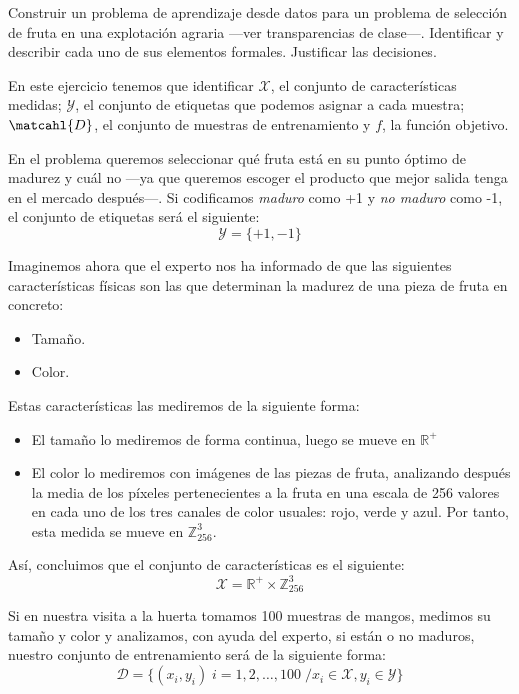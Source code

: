 \documentclass[a4paper, 11pt]{article}
\begin{document}
    \begin{ejercicio}
        Construir un problema de aprendizaje desde datos para un problema de selección de fruta en una explotación agraria ---ver transparencias de clase---. Identificar y describir cada uno de sus elementos formales. Justificar las decisiones.
    \end{ejercicio}

    \begin{solucion}
        En este ejercicio tenemos que identificar $\mathcal{X}$, el conjunto de características medidas; $\mathcal{Y}$, el conjunto de etiquetas que podemos asignar a cada muestra; $\matcahl{D}$, el conjunto de muestras de entrenamiento y $f$, la función objetivo.

        En el problema queremos seleccionar qué fruta está en su punto óptimo de madurez y cuál no ---ya que queremos escoger el producto que mejor salida tenga en el mercado después---. Si codificamos \emph{maduro} como +1 y \emph{no maduro} como -1, el conjunto de etiquetas será el siguiente:
        \[
        \mathcal{Y} = \{+1, -1\}
        \]

        Imaginemos ahora que el experto nos ha informado de que las siguientes características físicas son las que determinan la madurez de una pieza de fruta en concreto:
        \begin{itemize}
            \item Tamaño.
            \item Color.
        \end{itemize}

        Estas características las mediremos de la siguiente forma:
        \begin{itemize}
            \item El tamaño lo mediremos de forma continua, luego se mueve en $\mathbb{R}^+$
            \item El color lo mediremos con imágenes de las piezas de fruta, analizando después la media de los píxeles pertenecientes a la fruta en una escala de 256 valores en cada uno de los tres canales de color usuales: rojo, verde y azul. Por tanto, esta medida se mueve en $\mathbb{Z}_{256}^3$.
        \end{itemize}

        Así, concluimos que el conjunto de características es el siguiente:
        \[
        \mathcal{X} = \mathbb{R}^+ \times \mathbb{Z}_{256}^3
        \]

        Si en nuestra visita a  la huerta tomamos 100 muestras de mangos, medimos su tamaño y color y analizamos, con ayuda del experto, si están o no maduros, nuestro conjunto de entrenamiento será de la siguiente forma:
        \[
        \mathcal{D} = \{(x_i, y_i) \; i = 1, 2, \dots, 100 \;/ x_i \in \mathcal{X}, y_i\in\mathcal{Y} \}
        \]


\end{solucion}
\end{document}
